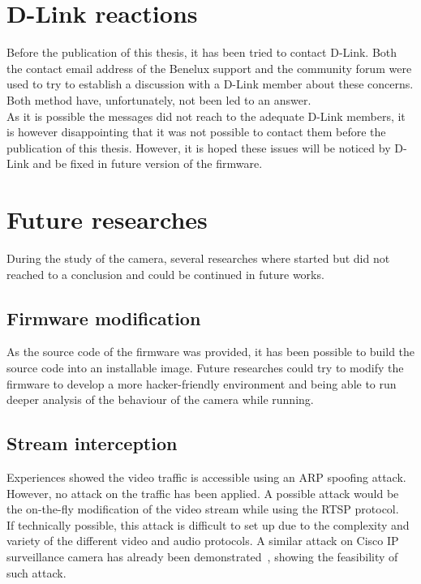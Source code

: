 \section{D-Link reactions}
\label{sec:dcs-dlink}

Before the publication of this thesis, it has been tried to contact D-Link.
Both the contact email address of the Benelux support and the community forum were used to try to establish a discussion with a D-Link member about these concerns.
Both method have, unfortunately, not been led to an answer.\\

As it is possible the messages did not reach to the adequate D-Link members, it is however disappointing that it was not possible to contact them before the publication of this thesis.
However, it is hoped these issues will be noticed by D-Link and be fixed in future version of the firmware.

\section{Future researches}
\label{sec:dcs-future}

During the study of the camera, several researches where started but did not reached to a conclusion and could be continued in future works.


\subsection{Firmware modification}

As the source code of the firmware was provided, it has been possible to build the source code into an installable image.
Future researches could try to modify the firmware to develop a more hacker-friendly environment and being able to run deeper analysis of the behaviour of the camera while running.

\subsection{Stream interception}

Experiences showed the video traffic is accessible using an ARP spoofing attack.
However, no attack on the traffic has been applied.
A possible attack would be the on-the-fly modification of the video stream while using the RTSP protocol.\\

If technically possible, this attack is difficult to set up due to the complexity and variety of the different video and audio protocols.
A similar attack on Cisco IP surveillance camera has already been demonstrated~\cite{ucsniff}, showing the feasibility of such attack.

